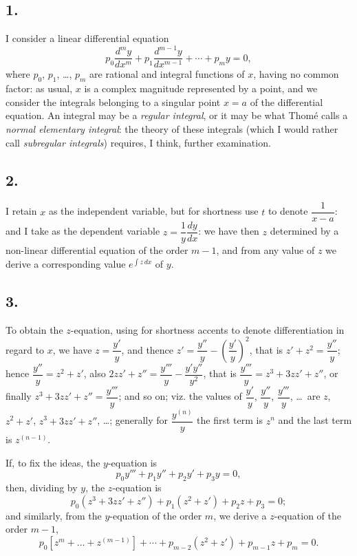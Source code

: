 \documentclass[11pt,a4paper]{book}
\begin{document}
\subsection*{1.}

I consider a linear differential equation
\[
p_0 \frac{d^m y}{dx^m} + p_1 \frac{d^{m-1} y}{dx^{m-1}} + \cdots + p_m y = 0,
\]
where $p_0$, $p_1$, \ldots, $p_m$ are rational and integral functions of $x$, having no common factor: as usual, $x$ is a complex magnitude represented by a point, and we consider the integrals belonging to a singular point $x = a$ of the differential equation. An integral may be a \textit{regular integral}, or it may be what Thom\'e calls a \textit{normal elementary integral}: the theory of these integrals (which I would rather call \textit{subregular integrals}) requires, I think, further examination.

\subsection*{2.}

I retain $x$ as the independent variable, but for shortness use $t$ to denote $\dfrac{1}{x - a}$: and I take as the dependent variable $z = \dfrac{1}{y}\dfrac{dy}{dx}$: we have then $z$ determined by a non-linear differential equation of the order $m - 1$, and from any value of $z$ we derive a corresponding value $e^{\int z\,dx}$ of $y$.

\subsection*{3.}

To obtain the $z$-equation, using for shortness accents to denote differentiation in regard to $x$, we have $z = \dfrac{y'}{y}$, and thence $z' = \dfrac{y''}{y} - \left(\dfrac{y'}{y}\right)^2$, that is $z' + z^2 = \dfrac{y''}{y}$; hence $\dfrac{y''}{y} = z^2 + z'$, also $2zz' + z'' = \dfrac{y'''}{y} - \dfrac{y'y''}{y^2}$, that is $\dfrac{y'''}{y} = z^3 + 3zz' + z''$, or finally $z^3 + 3zz' + z'' = \dfrac{y'''}{y}$; and so on; viz. the values of $\dfrac{y'}{y}$, $\dfrac{y''}{y}$, $\dfrac{y'''}{y}$, \ldots\ are $z$, $z^2 + z'$, $z^3 + 3zz' + z''$, \ldots; generally for $\dfrac{y^{(n)}}{y}$ the first term is $z^n$ and the last term is $z^{(n-1)}$.

If, to fix the ideas, the $y$-equation is
\[
p_0 y''' + p_1 y'' + p_2 y' + p_3 y = 0,
\]
then, dividing by $y$, the $z$-equation is
\[
p_0(z^3 + 3zz' + z'') + p_1(z^2 + z') + p_2 z + p_3 = 0;
\]
and similarly, from the $y$-equation of the order $m$, we derive a $z$-equation of the order $m - 1$,
\[
p_0[z^m + \ldots + z^{(m-1)}] + \cdots + p_{m-2}(z^2 + z') + p_{m-1}z + p_m = 0.
\]
\end{document}
